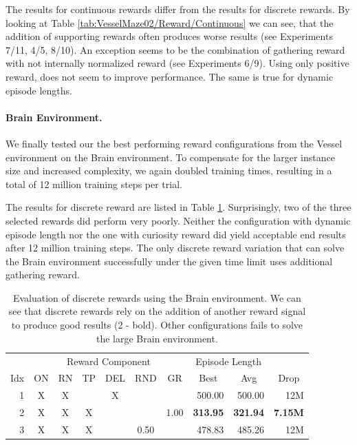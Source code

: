 The results for continuous rewards differ from the results for discrete rewards. By looking at Table \ref{tab:VesselMaze02/Reward/Continuous} we can see, that the addition of supporting rewards often produces worse results (see Experiments 7/11, 4/5, 8/10). An exception seems to be the combination of gathering reward with not internally normalized reward (see Experiments 6/9). Using only positive reward, does not seem to improve performance. The same is true for dynamic episode lengths.  


\paragraph{Brain Environment.} We finally tested our the best performing reward configurations from the Vessel environment on the Brain environment. To compensate for the larger instance size and increased complexity, we again doubled training times, resulting in a total of 12 million training steps per trial. 

The results for discrete reward are listed in Table \ref{tab:Maze0122/Reward/Discrete}. Surprisingly, two of the three selected rewards did perform very poorly. Neither the configuration with dynamic episode length nor the one with curiosity reward did yield acceptable end results after 12 million training steps. The only discrete reward variation that can solve the Brain environment successfully under the given time limit uses additional gathering reward. 


\begin{table}[htp]
    \begin{center}
        \begin{tabular}{rccccccrrr}
            \toprule
             & \multicolumn{6}{c}{Reward Component} & \multicolumn{2}{c}{Episode Length} & \\
            \cmidrule(lr){2-7}\cmidrule(lr){8-9}
            \multicolumn{1}{c}{Idx} & \multicolumn{1}{c}{ON} & \multicolumn{1}{c}{RN} & \multicolumn{1}{c}{TP} & \multicolumn{1}{c}{DEL} & \multicolumn{1}{c}{RND} & \multicolumn{1}{c}{GR} & \multicolumn{1}{c}{Best} & \multicolumn{1}{c}{Avg} & \multicolumn{1}{c}{Drop}\\
            \midrule
            1 & X & X &  & X &  &  & 500.00 & 500.00 & 12M \\
            2 & X & X & X &  &  & 1.00 & \textbf{313.95} & \textbf{321.94} & \textbf{7.15M} \\
            3 & X & X & X &  & 0.50 &  & 478.83 & 485.26 & 12M \\
            \bottomrule
        \end{tabular}
    \end{center}
    \caption[Evaluation of Discrete Rewards using the Brain Environment]{Evaluation of discrete rewards using the Brain environment. We can see that discrete rewards rely on the addition of another reward signal to produce good results (2 - bold). Other configurations fails to solve the large Brain environment.} \label{tab:Maze0122/Reward/Discrete}
\end{table}

